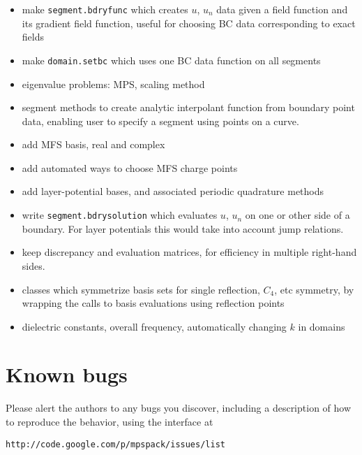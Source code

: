 \documentclass[12pt]{article}
\newcommand{\bi}{\begin{itemize}}
\newcommand{\ei}{\end{itemize}}
\begin{document}
\bi
\item make {\tt segment.bdryfunc} which creates $u$, $u_n$ data given a
field function and its gradient field function, useful for choosing BC
data corresponding to exact fields
\item make {\tt domain.setbc} which uses one BC data function on all segments
\item eigenvalue problems: MPS, scaling method
\item segment methods to create analytic interpolant function from boundary
point data, enabling user to specify a segment using points on a curve.
\item add MFS basis, real and complex
\item add automated ways to choose MFS charge points
\item add layer-potential bases, and associated periodic quadrature methods
\item write {\tt segment.bdrysolution} which evaluates $u$, $u_n$ on one
or other side of a boundary. For layer potentials this would take into account
jump relations.
\item keep discrepancy and evaluation matrices, for efficiency in multiple
right-hand sides.
\item classes which symmetrize basis sets for single reflection, $C_4$, etc
symmetry, by wrapping the calls to basis evaluations using reflection
points
\item dielectric constants, overall frequency,
automatically changing $k$ in domains
\ei

\section{Known bugs}

Please alert the authors to any bugs you discover, including a description
of how to reproduce the behavior, using the interface at

{\tt http://code.google.com/p/mpspack/issues/list}

 

\end{document}
